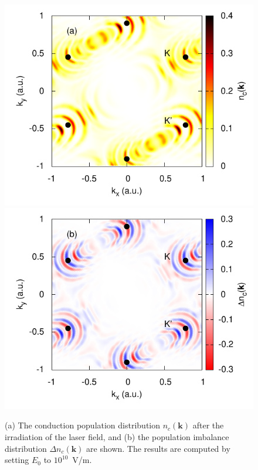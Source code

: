 \begin{figure}[htbp]
\centering
\includegraphics[width=0.8\linewidth]{pic/nex_pop_E0_1e10.pdf}
\includegraphics[width=0.8\linewidth]{pic/dnex_pop_E0_1e10.pdf}
\caption{\label{fig:nex_pop_E0_1e10} 
(a) The conduction population distribution $n_{c}(\mathbf k)$ after the irradiation of the laser field, and (b) the population imbalance distribution $\Delta n_c (\mathbf k)$ are shown. The results are computed by setting $E_0$ to $10^{10}$~V/m.
}
\end{figure}

